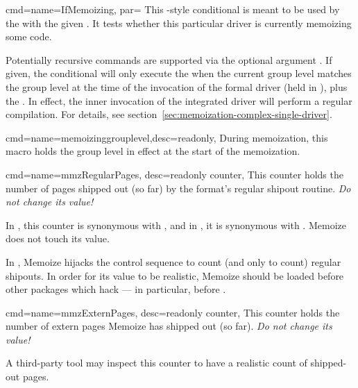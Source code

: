 \documentclass[a4paper,11pt]{article}
\begin{document}
\begin{doc}{
    cmd={name=IfMemoizing, par=}
  }
  This -style conditional is meant to be used by the
   with the given .  It tests whether
  this particular driver is currently memoizing some code.

  Potentially recursive commands are supported via the optional argument
  .  If given, the conditional will only execute the  when the current  group level matches the 
  group level at the time of the invocation of the formal driver (held in
  ), plus the .  In effect, the inner
  invocation of the integrated driver will perform a regular compilation.  For
  details, see section~\ref{sec:memoization-complex-single-driver}.
\end{doc}

\begin{doc}{
    cmd={name=memoizinggrouplevel,desc={readonly}},
  }
  During memoization, this macro holds the  group level in effect
  at the start of the memoization.
\end{doc}

\begin{doc}{
    cmd={name=mmzRegularPages, desc=readonly counter},
  }
  This counter holds the number of pages shipped out (so far) by the format's
  regular shipout routine.  \emph{Do not change its value!}

  In , this counter is synonymous with
  , and in , it is synonymous
  with .  Memoize does not touch its value.

  In , Memoize hijacks the  control sequence
  to count (and only to count) regular shipouts.  In order for its value to be
  realistic, Memoize should be loaded before other packages which hack
   --- in particular, before .
\end{doc}

\begin{doc}{
    cmd={name=mmzExternPages, desc=readonly counter},
  }
  This counter holds the number of extern pages Memoize has shipped out (so
  far).  \emph{Do not change its value!}

  A third-party tool may inspect this counter to have a realistic count of
  shipped-out pages.
\end{doc}
\end{document}
